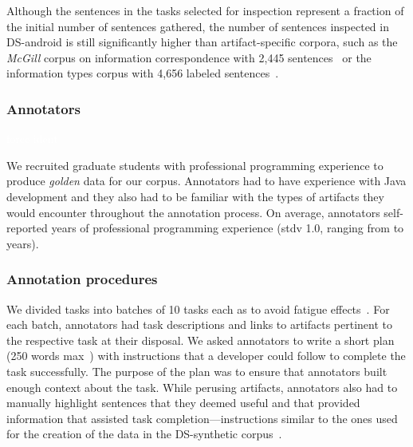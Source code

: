 Although the sentences in the tasks selected for inspection represent
a fraction of the initial number of sentences gathered, 
the number of sentences inspected in \acs{DS-android}
is still significantly higher than 
artifact-specific corpora, such as the \textit{McGill} corpus on information correspondence with 2,445 sentences~\cite{arya2020} or the information types corpus with 4,656 labeled sentences~\cite{Arya2019}.


\subsubsection{Annotators}
\textcolor{white}{force ident} %

We recruited  graduate students with professional programming experience to produce \textit{golden} data for our corpus. Annotators had to have experience with Java development and they also had to be familiar with the types of artifacts they would encounter throughout the annotation process. 
On average, annotators self-reported  years of professional
programming experience (stdv 1.0, ranging from  to  years).



\subsubsection{Annotation procedures}



We divided tasks into batches of 10 tasks each as to avoid fatigue effects~\cite{Ponzanelli2017}. For each batch, annotators had task descriptions and links to artifacts pertinent to the respective task at their disposal. We asked annotators to write a short plan (250 words max~\cite{Rastkar2010}) with instructions that a developer could follow to complete the task successfully. 
The purpose of the plan was to ensure that annotators built enough context about the task.
While perusing artifacts, annotators also had to manually highlight sentences that they deemed useful and that provided information that assisted task completion---instructions similar to the ones used for the creation of the data in the \acs{DS-synthetic} corpus~\cite{marques2020}.


